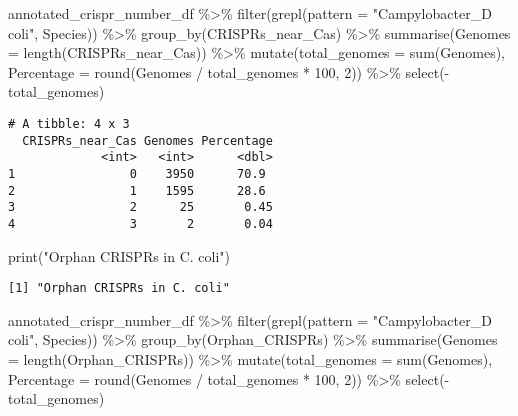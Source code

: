 \documentclass[
  twocolumn,
  landscape]{report}
\newenvironment{Shaded}{}{}
\newcommand{\AttributeTok}[1]{\textcolor[rgb]{0.84,0.23,0.29}{#1}}
\newcommand{\DecValTok}[1]{\textcolor[rgb]{0.00,0.36,0.77}{#1}}
\newcommand{\FunctionTok}[1]{\textcolor[rgb]{0.44,0.26,0.76}{#1}}
\newcommand{\NormalTok}[1]{\textcolor[rgb]{0.14,0.16,0.18}{#1}}
\newcommand{\SpecialCharTok}[1]{\textcolor[rgb]{0.00,0.36,0.77}{#1}}
\newcommand{\StringTok}[1]{\textcolor[rgb]{0.01,0.18,0.38}{#1}}
\begin{document}
\begin{Shaded}
\begin{Highlighting}[]
\NormalTok{annotated\_crispr\_number\_df }\SpecialCharTok{\%\textgreater{}\%}
  \FunctionTok{filter}\NormalTok{(}\FunctionTok{grepl}\NormalTok{(}\AttributeTok{pattern =} \StringTok{"Campylobacter\_D coli"}\NormalTok{, Species)) }\SpecialCharTok{\%\textgreater{}\%}
  \FunctionTok{group\_by}\NormalTok{(CRISPRs\_near\_Cas) }\SpecialCharTok{\%\textgreater{}\%}
  \FunctionTok{summarise}\NormalTok{(}\AttributeTok{Genomes =} \FunctionTok{length}\NormalTok{(CRISPRs\_near\_Cas)) }\SpecialCharTok{\%\textgreater{}\%}
  \FunctionTok{mutate}\NormalTok{(}\AttributeTok{total\_genomes =} \FunctionTok{sum}\NormalTok{(Genomes),}
         \AttributeTok{Percentage =} \FunctionTok{round}\NormalTok{(Genomes }\SpecialCharTok{/}\NormalTok{ total\_genomes }\SpecialCharTok{*} \DecValTok{100}\NormalTok{, }\DecValTok{2}\NormalTok{)) }\SpecialCharTok{\%\textgreater{}\%}
  \FunctionTok{select}\NormalTok{(}\SpecialCharTok{{-}}\NormalTok{total\_genomes)}
\end{Highlighting}
\end{Shaded}

\begin{verbatim}
# A tibble: 4 x 3
  CRISPRs_near_Cas Genomes Percentage
             <int>   <int>      <dbl>
1                0    3950      70.9 
2                1    1595      28.6 
3                2      25       0.45
4                3       2       0.04
\end{verbatim}

\begin{Shaded}
\begin{Highlighting}[]
\FunctionTok{print}\NormalTok{(}\StringTok{"Orphan CRISPRs in C. coli"}\NormalTok{)}
\end{Highlighting}
\end{Shaded}

\begin{verbatim}
[1] "Orphan CRISPRs in C. coli"
\end{verbatim}

\begin{Shaded}
\begin{Highlighting}[]
\NormalTok{annotated\_crispr\_number\_df }\SpecialCharTok{\%\textgreater{}\%}
  \FunctionTok{filter}\NormalTok{(}\FunctionTok{grepl}\NormalTok{(}\AttributeTok{pattern =} \StringTok{"Campylobacter\_D coli"}\NormalTok{, Species)) }\SpecialCharTok{\%\textgreater{}\%}
  \FunctionTok{group\_by}\NormalTok{(Orphan\_CRISPRs) }\SpecialCharTok{\%\textgreater{}\%}
  \FunctionTok{summarise}\NormalTok{(}\AttributeTok{Genomes =} \FunctionTok{length}\NormalTok{(Orphan\_CRISPRs)) }\SpecialCharTok{\%\textgreater{}\%}
  \FunctionTok{mutate}\NormalTok{(}\AttributeTok{total\_genomes =} \FunctionTok{sum}\NormalTok{(Genomes),}
         \AttributeTok{Percentage =} \FunctionTok{round}\NormalTok{(Genomes }\SpecialCharTok{/}\NormalTok{ total\_genomes }\SpecialCharTok{*} \DecValTok{100}\NormalTok{, }\DecValTok{2}\NormalTok{)) }\SpecialCharTok{\%\textgreater{}\%}
  \FunctionTok{select}\NormalTok{(}\SpecialCharTok{{-}}\NormalTok{total\_genomes)}
\end{Highlighting}
\end{Shaded}
\end{document}

